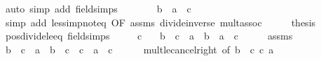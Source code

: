 \begin{isabellebody}
\ {\isacharparenleft}{\kern0pt}auto\ simp\ add{\isacharcolon}{\kern0pt}\ field{\isacharunderscore}{\kern0pt}simps{\isacharparenright}{\kern0pt}\isanewline
\ \ \isamarkupfalse%
\ \isamarkupfalse%
\ {\isachardoublequoteopen}{\isachardot}{\kern0pt}{\isachardot}{\kern0pt}{\isachardot}{\kern0pt}\ {\isasymlongleftrightarrow}\ b\ {\isasymle}\ a\ {\isacharasterisk}{\kern0pt}\ c{\isachardoublequoteclose}\isanewline
\ \ \ \ \isamarkupfalse%
\ {\isacharparenleft}{\kern0pt}simp\ add{\isacharcolon}{\kern0pt}\ less{\isacharunderscore}{\kern0pt}imp{\isacharunderscore}{\kern0pt}not{\isacharunderscore}{\kern0pt}eq\ {\isacharbrackleft}{\kern0pt}OF\ assms{\isacharbrackright}{\kern0pt}\ divide{\isacharunderscore}{\kern0pt}inverse\ mult{\isachardot}{\kern0pt}assoc{\isacharparenright}{\kern0pt}\isanewline
\ \ \isamarkupfalse%
\ \isamarkupfalse%
\ {\isacharquery}{\kern0pt}thesis\ \isacommand{{\isachardot}{\kern0pt}}\isamarkupfalse%
\isanewline
{}\isamarkupfalse%
%
\endisatagproof
{\isafoldproof}%
%
\isadelimproof
\isanewline
%
\endisadelimproof
\isanewline
{}\isamarkupfalse%
\ pos{\isacharunderscore}{\kern0pt}divide{\isacharunderscore}{\kern0pt}le{\isacharunderscore}{\kern0pt}eq\ {\isacharbrackleft}{\kern0pt}field{\isacharunderscore}{\kern0pt}simps{\isacharbrackright}{\kern0pt}{\isacharcolon}{\kern0pt}\isanewline
\ \ \ {\isachardoublequoteopen}{}\ {\isacharless}{\kern0pt}\ c{\isachardoublequoteclose}\isanewline
\ \ \ {\isachardoublequoteopen}b\ {\isacharslash}{\kern0pt}\ c\ {\isasymle}\ a\ {\isasymlongleftrightarrow}\ b\ {\isasymle}\ a\ {\isacharasterisk}{\kern0pt}\ c{\isachardoublequoteclose}\isanewline
%
\isadelimproof
%
\endisadelimproof
%
\isatagproof
{}\isamarkupfalse%
\ {\isacharminus}{\kern0pt}\isanewline
\ \ \isamarkupfalse%
\ assms\ \isamarkupfalse%
\ {\isachardoublequoteopen}b\ {\isacharslash}{\kern0pt}\ c\ {\isasymle}\ a\ {\isasymlongleftrightarrow}\ {\isacharparenleft}{\kern0pt}b\ {\isacharslash}{\kern0pt}\ c{\isacharparenright}{\kern0pt}\ {\isacharasterisk}{\kern0pt}\ c\ {\isasymle}\ a\ {\isacharasterisk}{\kern0pt}\ c{\isachardoublequoteclose}\isanewline
\ \ \ \ \isamarkupfalse%
\ mult{\isacharunderscore}{\kern0pt}le{\isacharunderscore}{\kern0pt}cancel{\isacharunderscore}{\kern0pt}right\ {\isacharbrackleft}{\kern0pt}of\ {\isachardoublequoteopen}b\ {\isacharslash}{\kern0pt}\ c{\isachardoublequoteclose}\ c\ a{\isacharbrackright}{\kern0pt}\ \isamarkupfalse%

\end{isabellebody}
